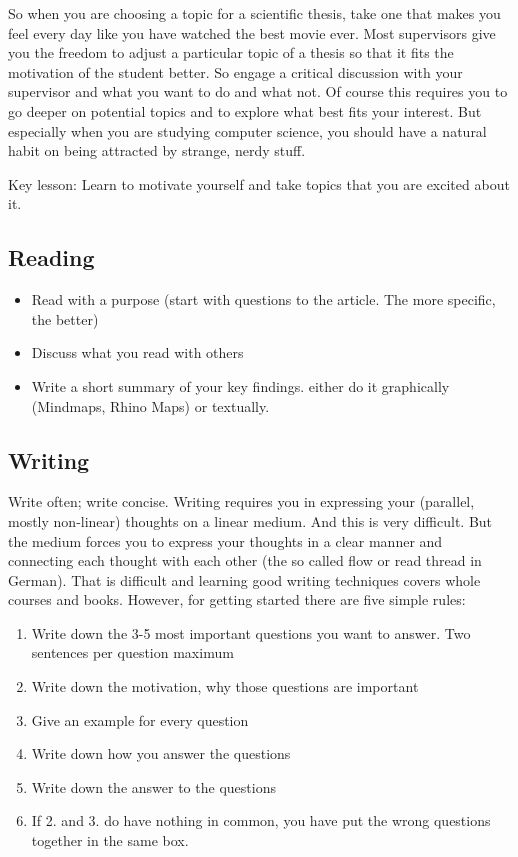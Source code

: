 So when you are choosing a topic for a scientific thesis, take one that makes you feel every day like you have watched the best movie ever. Most supervisors give you the freedom to adjust a particular topic of a thesis so that it fits the motivation of the student better. So engage a critical discussion with your supervisor and what you want to do and what not. Of course this requires you to go deeper on potential topics and to explore what best fits your interest. But especially when you are studying computer science, you should have a natural habit on being attracted by strange, nerdy stuff.

Key lesson: Learn to motivate yourself and take topics that you are excited about it.

\subsection{Reading}
\begin{itemize}
	\item Read with a purpose (start with questions to the article. The more specific, the better)
	\item Discuss what you read with others
	\item Write a short summary of your key findings. either do it graphically (Mindmaps, Rhino Maps) or textually.
\end{itemize}




\subsection{Writing}
Write often; write concise. Writing requires you in expressing your (parallel, mostly non-linear) thoughts on a linear medium. And this is very difficult. But the medium forces you to express your thoughts in a clear manner and connecting each thought with each other (the so called flow or read thread in German). That is difficult and learning good writing techniques covers whole courses and books. However, for getting started there are five simple rules:

\begin{enumerate}[1.]
	\item Write down the 3-5 most important questions you want to answer. Two sentences per question maximum
	\item Write down the motivation, why those questions are important
	\item Give an example for every question
	\item Write down how you answer the questions
	\item Write down the answer to the questions
	\item If 2. and 3. do have nothing in common, you have put the wrong questions together in the same box.
\end{enumerate}


